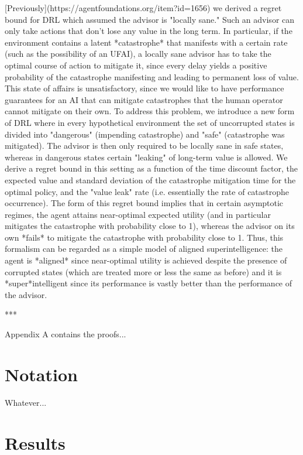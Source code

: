 \documentclass[a4paper]{article}
\begin{document}
[Previously](https://agentfoundations.org/item?id=1656) we derived a regret bound for DRL which assumed the advisor is "locally sane." Such an advisor can only take actions that don't lose any value in the long term. In particular, if the environment contains a latent *catastrophe* that manifests with a certain rate (such as the possibility of an UFAI), a locally sane advisor has to take the optimal course of action to mitigate it, since every delay yields a positive probability of the catastrophe manifesting and leading to permanent loss of value. This state of affairs is unsatisfactory, since we would like to have performance guarantees for an AI that can mitigate catastrophes that the human operator cannot mitigate on their own. To address this problem, we introduce a new form of DRL where in every hypothetical environment the set of uncorrupted states is divided into "dangerous" (impending catastrophe) and "safe" (catastrophe was mitigated). The advisor is then only required to be locally sane in safe states, whereas in dangerous states certain "leaking" of long-term value is allowed. We derive a regret bound in this setting as a function of the time discount factor, the expected value and standard deviation of the catastrophe mitigation time for the optimal policy, and the "value leak" rate (i.e. essentially the rate of catastrophe occurrence). The form of this regret bound implies that in certain asymptotic regimes, the agent attains near-optimal expected utility (and in particular mitigates the catastrophe with probability close to 1), whereas the advisor on its own *fails* to mitigate the catastrophe with probability close to 1. Thus, this formalism can be regarded as a simple model of aligned superintelligence: the agent is *aligned* since near-optimal utility is achieved despite the presence of corrupted states (which are treated more or less the same as before) and it is *super*intelligent since its performance is vastly better than the performance of the advisor.

***

Appendix A contains the proofs...

\section{Notation}

Whatever...

\section{Results}
\end{document}
